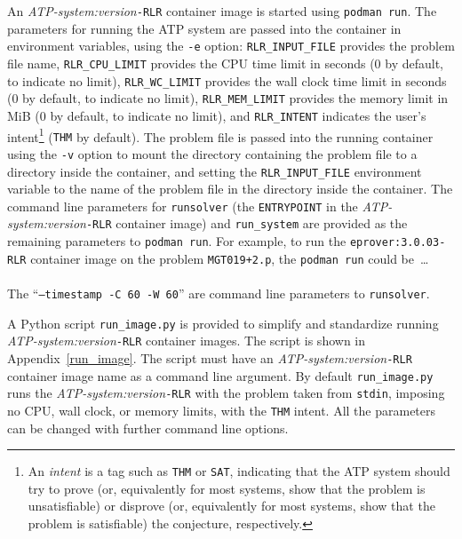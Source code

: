 \documentclass{easychair}
\begin{document}
An {\em ATP-system:version}{\tt -RLR} container image is started using {\tt podman run}.
The parameters for running the ATP system are passed into the container in environment variables,
using the {\tt -e} option:
{\tt RLR\_INPUT\_FILE} provides the problem file name,
{\tt RLR\_CPU\_LIMIT} provides the CPU time limit in seconds (0 by default, to indicate no limit),
{\tt RLR\_WC\_LIMIT} provides the wall clock time limit in seconds (0 by default, to indicate no 
limit),
{\tt RLR\_MEM\_LIMIT} provides the memory limit in MiB (0 by default, to indicate no limit),
and
{\tt RLR\_INTENT} indicates the user's intent\footnote{%
An {\em intent} is a tag such as {\tt THM} or {\tt SAT}, indicating that the ATP system should
try to prove (or, equivalently for most systems, show that the problem is unsatisfiable) or 
disprove (or, equivalently for most systems, show that the problem is satisfiable) the conjecture, 
respectively.}
({\tt THM} by default).
The problem file is passed into the running container using the {\tt -v} option to mount 
the directory containing the problem file to a directory inside the container, and setting the
{\tt RLR\_INPUT\_FILE} environment variable to the name of the problem file in the directory 
inside the container.
The command line parameters for {\tt runsolver} (the {\tt ENTRYPOINT} in the 
{\em ATP-system:version}{\tt -RLR} container image) and {\tt run\_system} are provided as the
remaining parameters to {\tt podman run}.
For example, to run the {\tt eprover:3.0.03-RLR} container image on the problem {\tt MGT019+2.p},
the {\tt podman run} could be~\ldots \\
\hspace*{1cm}{\tt podman run -t eprover:3.0.03-RLR -v .:/artifacts/CWD \\
-e RLR\_INPUT\_FILE='/artifacts/CWD/MGT019+2.p' -e RLR\_CPU\_LIMIT='60' \\
-e RLR\_WC\_LIMIT='60' -e RLR\_MEM\_LIMIT='0' -e RLR\_INTENT='SAT' \\
--timestamp -C 60 -W 60 run\_system} \\
The ``{\tt --timestamp -C 60 -W 60}'' are command line parameters to {\tt runsolver}.

A Python script {\tt run\_image.py} is provided to simplify and standardize running 
{\em ATP-system:version}{\tt -RLR} container images.
The script is shown in Appendix~\ref{run_image}.
The script must have an {\em ATP-system:version}{\tt -RLR} container image name as a 
command line argument.
By default {\tt run\_image.py} runs the {\em ATP-system:version}{\tt -RLR} with the problem 
taken from {\tt stdin}, imposing no CPU, wall clock, or memory limits, with the {\tt THM} intent.
All the parameters can be changed with further command line options.
\end{document}
